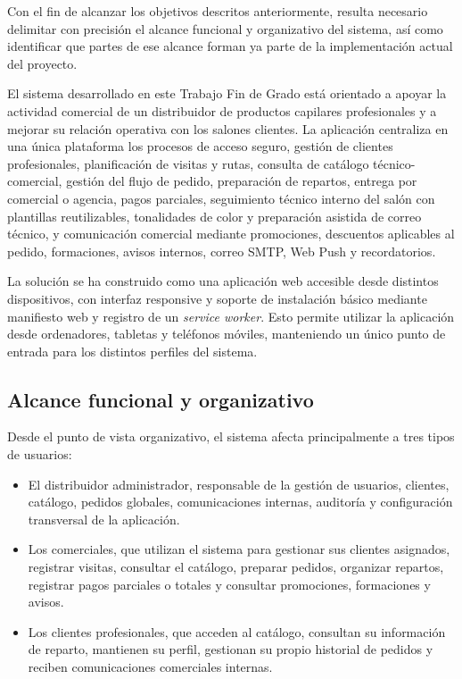 Con el fin de alcanzar los objetivos descritos anteriormente, resulta necesario delimitar con precisión el alcance funcional y organizativo del sistema, así como identificar que partes de ese alcance forman ya parte de la implementación actual del proyecto.

El sistema desarrollado en este Trabajo Fin de Grado está orientado a apoyar la actividad comercial de un distribuidor de productos capilares profesionales y a mejorar su relación operativa con los salones clientes. La aplicación centraliza en una única plataforma los procesos de acceso seguro, gestión de clientes profesionales, planificación de visitas y rutas, consulta de catálogo técnico-comercial, gestión del flujo de pedido, preparación de repartos, entrega por comercial o agencia, pagos parciales, seguimiento técnico interno del salón con plantillas reutilizables, tonalidades de color y preparación asistida de correo técnico, y comunicación comercial mediante promociones, descuentos aplicables al pedido, formaciones, avisos internos, correo SMTP, Web Push y recordatorios.

La solución se ha construido como una aplicación web accesible desde distintos dispositivos, con interfaz responsive y soporte de instalación básico mediante manifiesto web y registro de un \textit{service worker}. Esto permite utilizar la aplicación desde ordenadores, tabletas y teléfonos móviles, manteniendo un único punto de entrada para los distintos perfiles del sistema.

\subsection{Alcance funcional y organizativo}
Desde el punto de vista organizativo, el sistema afecta principalmente a tres tipos de usuarios:

\begin{itemize}
    \item El distribuidor administrador, responsable de la gestión de usuarios, clientes, catálogo, pedidos globales, comunicaciones internas, auditoría y configuración transversal de la aplicación.
    \item Los comerciales, que utilizan el sistema para gestionar sus clientes asignados, registrar visitas, consultar el catálogo, preparar pedidos, organizar repartos, registrar pagos parciales o totales y consultar promociones, formaciones y avisos.
    \item Los clientes profesionales, que acceden al catálogo, consultan su información de reparto, mantienen su perfil, gestionan su propio historial de pedidos y reciben comunicaciones comerciales internas.
\end{itemize}

